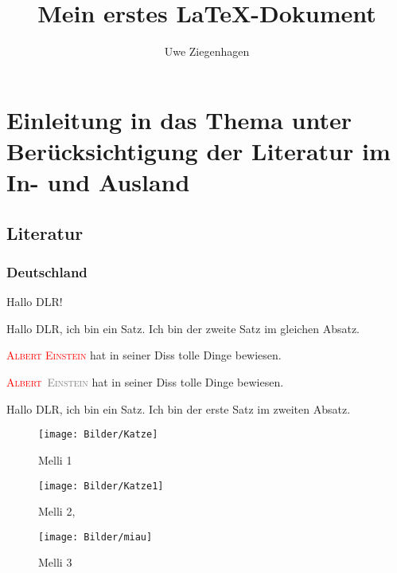 \documentclass[12pt,ngerman,parskip=half]{scrartcl}
\author{Uwe Ziegenhagen}
\title{Mein erstes LaTeX-Dokument}
\newcommand{\person}[1]{\textsc{\textcolor{red}{#1}}}
\newcommand{\Person}[2]{\textsc{\textcolor{red}{#1}~\textcolor{gray}{#2}}}
\begin{document}
\maketitle

\tableofcontents


\listoffigures

\section[Einleitung und Überblick]{Einleitung in das Thema unter Berücksichtigung der Literatur im In- und Ausland}\label{sec:Einleitung}
\subsection{Literatur}

\subsubsection{Deutschland}

Hallo DLR!

Hallo DLR, ich bin ein Satz. Ich bin der zweite Satz im gleichen Absatz.

\person{Albert Einstein} hat in seiner Diss tolle Dinge bewiesen. 

\Person{Albert}{Einstein} hat in seiner Diss tolle Dinge bewiesen. 

Hallo DLR, ich bin ein Satz.  Ich bin der erste Satz im zweiten Absatz.

\begin{figure}
\begin{center}
\texttt{[image: Bilder/Katze]}
\caption{Melli 1}\label{fig:Katze}
\end{center}
\end{figure}

\blindtext[10]


\begin{figure}
\begin{center}
\texttt{[image: Bilder/Katze1]}
\caption[Kurzversion der caption]{Melli 2, \blindtext}
\end{center}
\end{figure}

\blindtext[10]


\begin{figure}
\begin{center}
\texttt{[image: Bilder/miau]}
\caption{Melli 3}
\end{center}
\end{figure}
\end{document}
